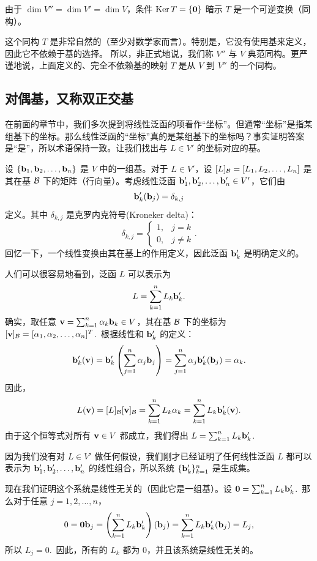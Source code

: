 由于 $\dim V'' = \dim V' = \dim V$，条件 $\operatorname{Ker} T = \{\mathbf{0}\}$ 暗示 $T$ 是一个可逆变换（同构）。

这个同构 $T$ 是非常自然的（至少对数学家而言）。特别是，它没有使用基来定义，因此它不依赖于基的选择。
所以，非正式地说，我们称 $V''$ 与 $V$ 典范同构。更严谨地说，上面定义的、完全不依赖基的映射 $T$ 是从 $V$ 到 $V''$ 的一个同构。


\subsection{对偶基，又称双正交基}\label{sec:08-01-03}

在前面的章节中，我们多次提到将线性泛函的项看作“坐标”。但通常“坐标”是指某组基下的坐标。那么线性泛函的“坐标”真的是某组基下的坐标吗？事实证明答案是“是”，所以术语保持一致。让我们找出与 $L \in V'$ 的坐标对应的基。

设 $\{\mathbf{b}_1, \mathbf{b}_2, \dots, \mathbf{b}_n\}$ 是 $V$ 中的一组基。对于 $L \in V'$，设 $[L]_{\mathcal{B}} = [L_1, L_2, \dots, L_n]$ 是其在基 $\mathcal{B}$ 下的矩阵（行向量）。考虑线性泛函 $\mathbf{b}'_1, \mathbf{b}'_2, \dots, \mathbf{b}'_n \in V'$，它们由
\begin{equation}\label{eq:08-01-02}
\mathbf{b}'_k(\mathbf{b}_j) = \delta_{k,j}
\end{equation}
定义。其中 $\delta_{k,j}$ 是克罗内克符号(Kroneker delta)：
$$\delta_{k,j} = \begin{cases} 1, & j=k \\ 0, & j \neq k \end{cases}.$$
回忆一下，一个线性变换由其在基上的作用定义，因此泛函 $\mathbf{b}'_k$ 是明确定义的。

人们可以很容易地看到，泛函 $L$ 可以表示为
$$L = \sum_{k=1}^n L_k \mathbf{b}'_k.$$
确实，取任意 $\mathbf{v} = \sum_{k=1}^n \alpha_k \mathbf{b}_k \in V$，其在基 $\mathcal{B}$ 下的坐标为 $[\mathbf{v}]_{\mathcal{B}} = [\alpha_1, \alpha_2, \dots, \alpha_n]^T$.~根据线性和 $\mathbf{b}'_k$ 的定义：
$$\mathbf{b}'_k(\mathbf{v}) = \mathbf{b}'_k \left( \sum_{j=1}^n \alpha_j \mathbf{b}_j \right) = \sum_{j=1}^n \alpha_j \mathbf{b}'_k(\mathbf{b}_j) = \alpha_k.$$
因此，
$$L(\mathbf{v}) = [L]_{\mathcal{B}} [\mathbf{v}]_{\mathcal{B}} = \sum_{k=1}^n L_k \alpha_k = \sum_{k=1}^n L_k \mathbf{b}'_k(\mathbf{v}).$$
由于这个恒等式对所有 $\mathbf{v} \in V$ 都成立，我们得出 $L = \sum_{k=1}^n L_k \mathbf{b}'_k$.~

因为我们没有对 $L \in V'$ 做任何假设，我们刚才已经证明了任何线性泛函 $L$ 都可以表示为 $\mathbf{b}'_1, \mathbf{b}'_2, \dots, \mathbf{b}'_n$ 的线性组合，所以系统 $\{\mathbf{b}'_k\}_{k=1}^n$ 是生成集。

现在我们证明这个系统是线性无关的（因此它是一组基）。设 $\mathbf{0} = \sum_{k=1}^n L_k \mathbf{b}'_k$.~那么对于任意 $j = 1, 2, \dots, n$，
$$0 = \mathbf{0}  \mathbf{b}_j = \left( \sum_{k=1}^n L_k \mathbf{b}'_k \right) (\mathbf{b}_j) = \sum_{k=1}^n L_k \mathbf{b}'_k(\mathbf{b}_j) = L_j,$$
所以 $L_j = 0$.~因此，所有的 $L_k$ 都为 0，并且该系统是线性无关的。


